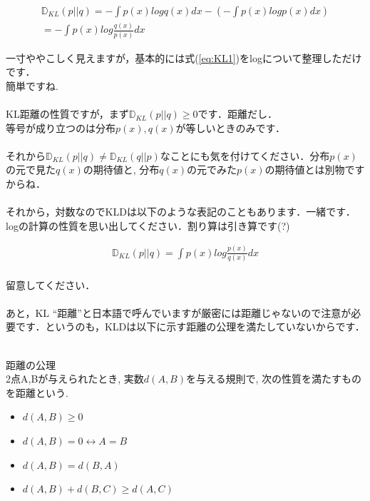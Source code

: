 \documentclass[11pt,a4paper]{jsarticle}                    %
\begin{document}
\begin{eqnarray}
\label{eq:KLD}
  \mathbb{D}_{KL}(p||q) = - \int p(x) log q(x)dx - (-\int p(x) log p(x)dx)\\
  = -\int p(x) log \frac{q(x)}{p(x)} dx
\end{eqnarray}

一寸ややこしく見えますが，基本的には式(\ref{eq:KL1})をlogについて整理しただけです．\\簡単ですね.\\
\\

KL距離の性質ですが，まず$\mathbb{D}_{KL}(p||q) \geq 0$です．距離だし．\\
等号が成り立つのは分布$p(x), q(x)$が等しいときのみです．\\
\\
それから$\mathbb{D}_{KL}(p||q) \neq \mathbb{D}_{KL}(q||p)$なことにも気を付けてください．分布$p(x)$の元で見た$q(x)$の期待値と, 分布$q(x)$の元でみた$p(x)$の期待値とは別物ですからね．\\
\\
それから，対数なのでKLDは以下のような表記のこともあります．一緒です．logの計算の性質を思い出してください．割り算は引き算です(?)

\begin{eqnarray}
\label{eq:KLD}
  \mathbb{D}_{KL}(p||q) =  \int p(x) log \frac{p(x)}{q(x)} dx
\end{eqnarray}
\\
留意してください．\\
\\
あと，KL ``距離''と日本語で呼んでいますが厳密には距離じゃないので注意が必要です．というのも，KLDは以下に示す距離の公理\cite{distance}を満たしていないからです．\\
\\

\begin{screen}
距離の公理\\
2点A,Bが与えられたとき, 実数$d(A,B)$を与える規則で, 次の性質を満たすものを距離という.
\begin{itemize}
\item{$d(A, B) \geq 0$}
\item{$d(A, B) = 0 \leftrightarrow A=B$}
\item{$d(A, B) = d(B, A)$}
\item{$d(A, B) + d(B, C) \geq d(A, C)$}
\end{itemize}
\end{screen}
\end{document}
